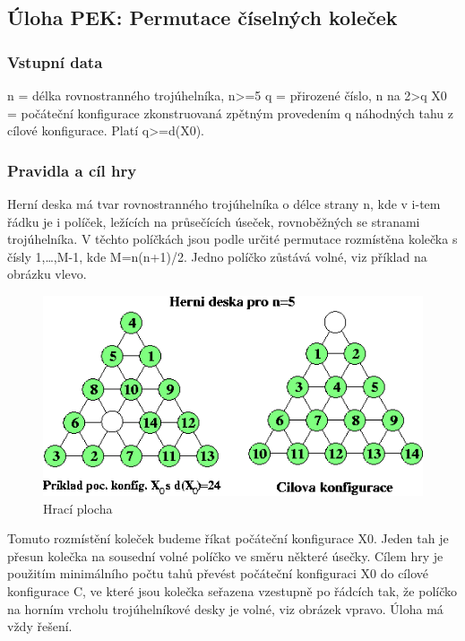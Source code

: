 \documentclass[12pt,a4paper]{article}
\begin{document}
\subsection{Úloha PEK: Permutace číselných koleček}

\subsubsection{Vstupní data}

n = délka rovnostranného trojúhelníka, n>=5 
q = přirozené číslo, n na 2>q 
X0 = počáteční konfigurace zkonstruovaná zpětným provedením q náhodných tahu z cílové konfigurace. Platí q>=d(X0). 

\subsubsection{Pravidla a cíl hry}

Herní deska má tvar rovnostranného trojúhelníka o délce strany n, kde v i-tem řádku je i políček, ležících na průsečících úseček, rovnoběžných se stranami trojúhelníka. V těchto políčkách jsou podle určité permutace rozmístěna kolečka s čísly 1,…,M-1, kde M=n(n+1)/2. Jedno políčko zůstává volné, viz příklad na obrázku vlevo.

\begin{figure}[ht]
\includegraphics[width=\textwidth]{pek.png}
\caption{Hrací plocha}
\label{pek}
\end{figure}

Tomuto rozmístění koleček budeme říkat počáteční konfigurace X0. Jeden tah je přesun kolečka na sousední volné políčko ve směru některé úsečky. Cílem hry je použitím minimálního počtu tahů převést počáteční konfiguraci X0 do cílové konfigurace C, ve které jsou kolečka seřazena vzestupně po řádcích tak, že políčko na horním vrcholu trojúhelníkové desky je volné, viz obrázek vpravo. Úloha má vždy řešení.
\end{document}
